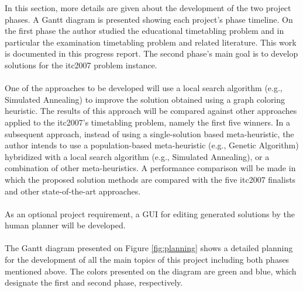 In this section, more details are given about the development of the two project phases. A Gantt diagram is presented showing each project's phase timeline. On the first phase the author studied the educational timetabling problem and in particular the examination timetabling problem and related literature. This work is documented in this progress report. The second phase's main goal is to develop solutions for the \gls{itc2007} problem instance. \\
\\
One of the approaches to be developed will use a local search algorithm (e.g., Simulated Annealing) to improve the solution obtained using a graph coloring heuristic. The results of this approach will be compared against other approaches applied to the \gls{itc2007}’s timetabling problem, namely the first five winners. In a subsequent approach, instead of using a single-solution based meta-heuristic, the author intends to use a population-based meta-heuristic (e.g., Genetic Algorithm) hybridized with a local
search algorithm (e.g., Simulated Annealing), or a combination of other meta-heuristics. A performance comparison will be made in which the proposed solution methods are compared with the five \gls{itc2007} finalists and other state-of-the-art approaches. \\
\\
As an optional project requirement, a GUI for editing generated solutions by the human planner will be developed.\\
\\
The Gantt diagram presented on Figure \ref{fig:planning} shows a detailed planning for the development of all the main topics of this project including both phases mentioned above. The colors presented on the diagram are green and blue, which designate the first and second phase, respectively.\\

